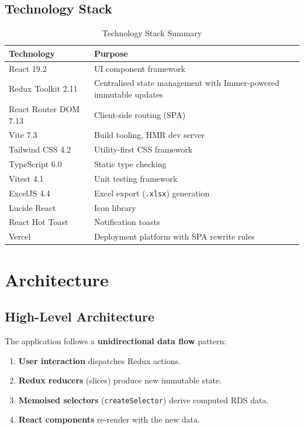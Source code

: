 \documentclass[12pt, a4paper, oneside]{report}
\newcommand{\code}[1]{\texttt{\textcolor{codered}{#1}}}
\begin{document}
\section{Technology Stack}

\begin{table}[H]
\centering
\caption{Technology Stack Summary}
\begin{tabularx}{\textwidth}{lX}
\toprule
\textbf{Technology} & \textbf{Purpose} \\
\midrule
React 19.2            & UI component framework \\
Redux Toolkit 2.11    & Centralised state management with Immer-powered immutable updates \\
React Router DOM 7.13 & Client-side routing (SPA) \\
Vite 7.3              & Build tooling, HMR dev server \\
Tailwind CSS 4.2      & Utility-first CSS framework \\
TypeScript 6.0        & Static type checking \\
Vitest 4.1            & Unit testing framework \\
ExcelJS 4.4           & Excel export (\texttt{.xlsx}) generation \\
Lucide React          & Icon library \\
React Hot Toast       & Notification toasts \\
Vercel                & Deployment platform with SPA rewrite rules \\
\bottomrule
\end{tabularx}
\end{table}


\chapter{Architecture}

\section{High-Level Architecture}

The application follows a \textbf{unidirectional data flow} pattern:

\begin{enumerate}
  \item \textbf{User interaction} dispatches Redux actions.
  \item \textbf{Redux reducers} (slices) produce new immutable state.
  \item \textbf{Memoised selectors} (\code{createSelector}) derive computed RDS data.
  \item \textbf{React components} re-render with the new data.
\end{enumerate}
\end{document}
